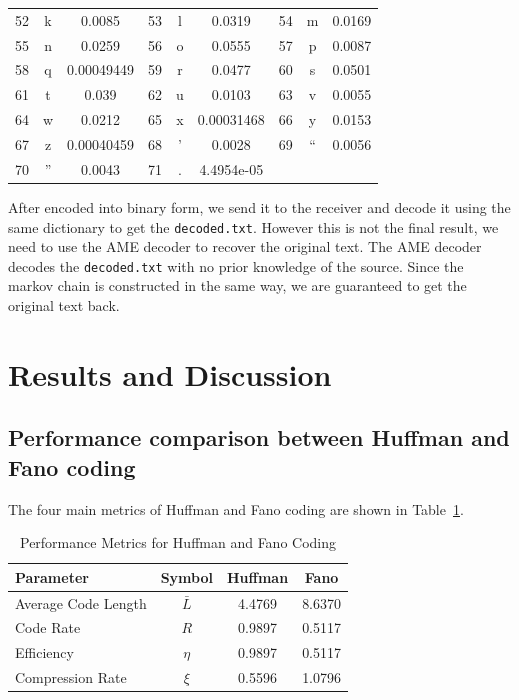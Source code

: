 \documentclass[12pt,twoside]{article}
\begin{document}
\begin{longtable}{ccc||ccc||ccc}
    52 & k & 0.0085 & 53 & l & 0.0319 & 54 & m & 0.0169 \\ 
    55 & n & 0.0259 & 56 & o & 0.0555 & 57 & p & 0.0087 \\ 
    58 & q & 0.00049449 & 59 & r & 0.0477 & 60 & s & 0.0501 \\ 
    61 & t & 0.039 & 62 & u & 0.0103 & 63 & v & 0.0055 \\ 
    64 & w & 0.0212 & 65 & x & 0.00031468 & 66 & y & 0.0153 \\ 
    67 & z & 0.00040459 & 68 & ' & 0.0028 & 69 & `` & 0.0056 \\ 
    70 & '' & 0.0043 & 71 & . & 4.4954e-05 &  &  &  \\ 
    \bottomrule
\end{longtable}








After encoded into binary form, we send it to the receiver and decode it using the same dictionary to get the \texttt{decoded.txt}. However this is not the final result, we need to use the AME decoder to recover the original text. The AME decoder decodes the \texttt{decoded.txt} with no prior knowledge of the source. Since the markov chain is constructed in the same way, we are guaranteed to get the original text back.


\section{Results and Discussion}
\label{sec:result}

\subsection{Performance comparison between Huffman and Fano coding}

The four main metrics of Huffman and Fano coding are shown in Table~\ref{tab:metrics}.

\begin{table}[h!]
    \caption{Performance Metrics for Huffman and Fano Coding}
    \label{tab:metrics}
    \centering
    \begin{tabular}{lccc}
    \toprule
    \textbf{Parameter} & \textbf{Symbol} & \textbf{Huffman} & \textbf{Fano} \\ \hline
    Average Code Length & $\bar{L}$ & 4.4769 & 8.6370 \\ 
    Code Rate & $R$ & 0.9897 & 0.5117      \\ 
    Efficiency & $\eta$ & 0.9897 & 0.5117  \\ 
    Compression Rate & $\xi$ & 0.5596 & 1.0796  \\ 
    \bottomrule
    \end{tabular}
\end{table}
\end{document}
